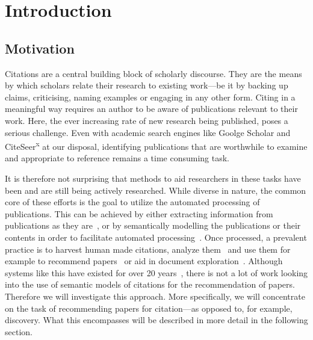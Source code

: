 \chapter{Introduction}\label{chap:introduction}
\section{Motivation}
Citations are a central building block of scholarly discourse. They are the means by which scholars relate their research to existing work---be it by backing up claims, criticising, naming examples or engaging in any other form. Citing in a meaningful way requires an author to be aware of publications relevant to their work.
Here, the ever increasing rate of new research being published, poses a serious challenge. Even with academic search engines like Goolge Scholar and CiteSeer\textsuperscript{x} at our disposal, identifying publications that are worthwhile to examine and appropriate to reference remains a time consuming task.

It is therefore not surprising that methods to aid researchers in these tasks have been and are still being actively researched. While diverse in nature, the common core of these efforts is the goal to utilize the automated processing of publications. This can be achieved by either extracting information from publications as they are~\cite{Nasar2018,Beel2016}, or by semantically modelling the publications or their contents in order to facilitate automated processing~\cite{BuckinghamShum2000,Peroni2012,Huh2014,Jaradeh2019}. %
Once processed, a prevalent practice is to harvest human made citations, analyze them~\cite{Abujbara2013,Teufel2006a} and use them for example to recommend papers~\cite{Beel2016} or aid in document exploration~\cite{Berger2016}. Although systems like this have existed for over 20 years~\cite{Bollacker1998,Beel2016}, there is not a lot of work looking into the use of semantic models of citations for the recommendation of papers.
Therefore we will investigate this approach. More specifically, we will concentrate on the task of recommending papers for citation---as opposed to, for example, discovery. What this encompasses will be described in more detail in the following section.

